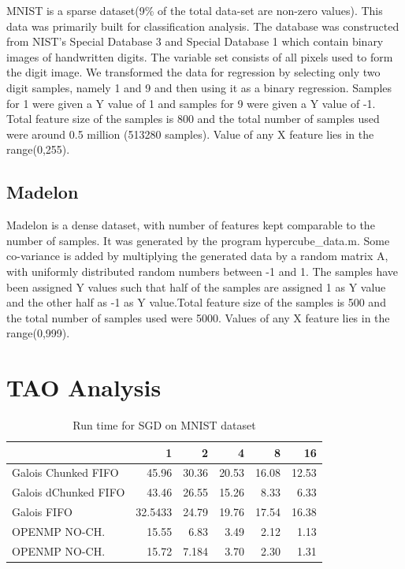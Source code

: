 \documentclass{sigplanconf}
\begin{document}
MNIST is a sparse dataset(9\% of the total data-set are non-zero values). This data was primarily built for classification analysis. The database was constructed from NIST's Special Database 3 and Special Database 1 which contain binary images of handwritten digits. The variable set consists of all pixels used to form the digit image. We transformed the data for regression by selecting only two digit samples, namely 1 and 9 and then using it as a binary regression. Samples for 1 were given a Y value of 1 and samples for 9 were given a Y value of -1. Total feature size of the samples is 800 and the total number of samples used were around 0.5 million (513280 samples). Value of any X feature lies in the range(0,255).

\subsection{Madelon}
Madelon is a dense dataset, with number of features kept comparable to the number of samples. It was generated by the program hypercube\_data.m. Some co-variance is added by multiplying the generated data by a random matrix A, with uniformly distributed random numbers between -1 and 1. The samples have been assigned Y values such that half of the samples are assigned 1 as Y value and the other half as -1 as Y value.Total feature size of the samples is 500 and the total number of samples used were 5000. Values of any X feature lies in the range(0,999).

\section{TAO Analysis}

\begin{table}
\caption{Run time for SGD on MNIST dataset}
\begin{tabular}{|l|r|r|r|r|r|}
\hline
 & 1 & 2 & 4 & 8 & 16 \\ \hline
Galois Chunked FIFO & 45.96 & 30.36 & 20.53 & 16.08 & 12.53 \\ \hline
Galois dChunked FIFO & 43.46 & 26.55 & 15.26 & 8.33 & 6.33 \\ \hline
Galois FIFO & 32.5433 & 24.79 & 19.76 & 17.54 & 16.38 \\ \hline
OPENMP NO-CH. & 15.55 & 6.83 & 3.49 & 2.12 & 1.13 \\ \hline
OPENMP NO-CH. & 15.72 & 7.184 & 3.70 & 2.30 & 1.31 \\ \hline
\end{tabular}
\end{table}
\end{document}
